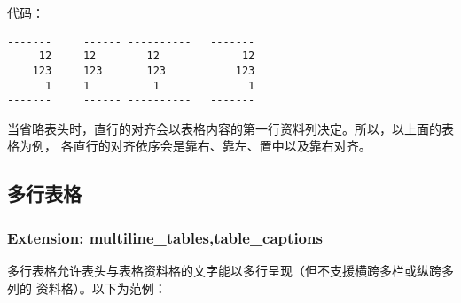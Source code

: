\documentclass[fancyhdr,bookmark]{ctexbook}
\begin{document}
代码：

\begin{lstlisting}
-------     ------ ----------   -------
     12     12        12             12
    123     123       123           123
      1     1          1              1
-------     ------ ----------   -------
\end{lstlisting}

当省略表头时，直行的对齐会以表格内容的第一行资料列决定。所以，以上面的表格为例，
各直行的对齐依序会是靠右、靠左、置中以及靠右对齐。

\subsection{多行表格}\label{ux591aux884cux8868ux683c}

\subsubsection{Extension:
multiline\_tables,table\_captions}\label{extension-multilineux5ftablestableux5fcaptions}

多行表格允许表头与表格资料格的文字能以多行呈现（但不支援横跨多栏或纵跨多列的
资料格）。以下为范例：
\end{document}

